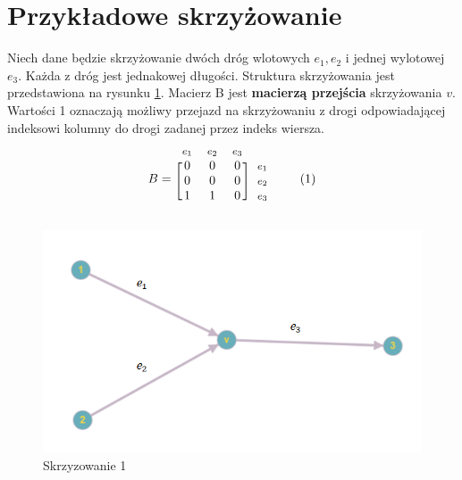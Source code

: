 \documentclass[12pt]{book}
\newcommand\addtag{\refstepcounter{equation}
\renewcommand{\labelenumii}{\theenumii}
\renewcommand{\theenumii}{\theenumi.\arabic{enumii}.}
\tag{\theequation}}
\begin{document}
\section{Przykładowe skrzyżowanie}
Niech dane będzie skrzyżowanie dwóch dróg wlotowych $e_1,e_2$ i jednej wylotowej $e_3$. Każda z dróg jest jednakowej długości. Struktura skrzyżowania jest przedstawiona na rysunku \ref{fig:skrz_1}.
Macierz B jest \textbf{macierzą przejścia} skrzyżowania $v$. Wartości 1 oznaczają możliwy przejazd na skrzyżowaniu z drogi odpowiadającej indeksowi kolumny do drogi zadanej przez indeks wiersza.
\begin{equation*}
  B=
  \begin{blockarray}{*{3}{c} l}
    \begin{block}{*{3}{>{$\footnotesize}c<{$}} l}
     $e_1$ & $e_2$ & $e_3$\\
    \end{block}
    \begin{block}{[*{3}{c}]>{$\footnotesize}l<{$}}
       0 & 0 & 0 & $e_1$ \\
       0 & 0 & 0 & $e_2$ \\
       1 & 1 & 0 & $e_3$ \\
    \end{block}
  \end{blockarray} \addtag
\end{equation*}

\begin{figure}[H]
  \centering
    \includegraphics[width=14cm]{skrz_1}
 \caption{Skrzyzowanie 1}
 \label{fig:skrz_1}
\end{figure}
\end{document}
